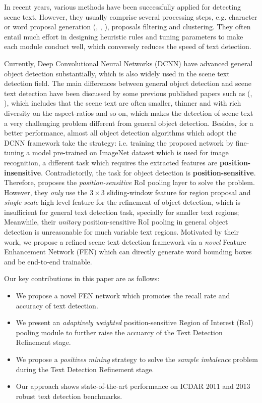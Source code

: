 \documentclass[letterpaper]{article}
\begin{document}
In recent years, various methods have been successfully applied for detecting scene text. However, they usually comprise several processing steps, e.g. character or word proposal generation (\cite{neumann2012real}, \cite{huang2014robust}, \cite{jaderberg2016reading}), proposals filtering and clustering. They often entail much effort in designing heuristic rules and tuning parameters to make each module conduct well, which conversely reduces the speed of text detection. 

Currently, Deep Convolutional Neural Networks (DCNN) have advanced general object detection substantially, which is also widely used in the scene text detection field. The main differences between general object detection and scene text detection have been discussed by some previous published papers such as (\cite{tian2015text}, \cite{sun2015robust}), which includes that the scene text are often smaller, thinner and with rich diversity on the aspect-ratios and so on, which makes the detection of scene text a very challenging problem different from general object detection. Besides, for a better performance, almost all object detection algorithms which adopt the DCNN framework take the strategy: i.e. training the proposed network by fine-tuning a model pre-trained on ImageNet dataset \cite{russakovsky2015imagenet} which is used for image recognition, a different task which requires the extracted features are \textbf{position-insensitive}. Contradictorily, the task for object detection is \textbf{position-sensitive}. Therefore, \cite{dai2016r} proposes the \textit{position-sensitive} RoI pooling layer to solve the problem. However, they \textit{only} use the $ 3\times 3$ sliding-window feature for region proposal and \textit{single scale} high level feature for the refinement of object detection, which is insufficient for general text detection task, specially for smaller text regions; Meanwhile, their \textit{unitary} position-sensitive RoI pooling in general object detection is unreasonable for much variable text regions. Motivated by their work, we propose a refined scene text detection framework via a \textit{novel} Feature Enhancement Network (FEN)  which can directly generate word bounding boxes and be end-to-end trainable.

Our key contributions in this paper are as follows:
\begin{itemize}
\item We propose a novel FEN network which promotes the recall rate and accuracy of text detection.
\item We present an \textit{adaptively weighted} position-sensitive Region of Interest (RoI) pooling module to further raise the accuarcy of the Text Detection Refinement stage.
\item We propose a \textit{positives mining} strategy to solve the \textit{sample imbalence} problem during the Text Detection Refinement stage.
\item Our approach shows state-of-the-art performance on ICDAR 2011 and 2013 robust text detection benchmarks.
\end{itemize}
\end{document}
